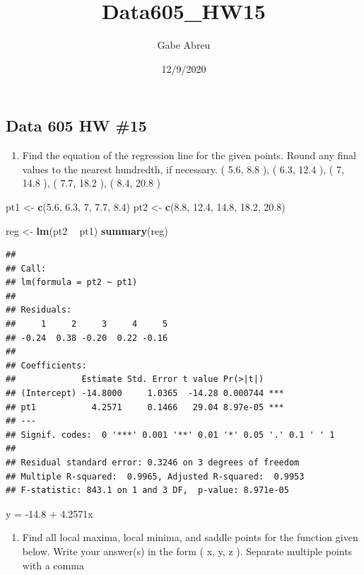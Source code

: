 \documentclass[
]{article}
\title{Data605\_HW15}
\author{Gabe Abreu}
\date{12/9/2020}
\newenvironment{Shaded}{\begin{snugshade}}{\end{snugshade}}
\newcommand{\DecValTok}[1]{\textcolor[rgb]{0.00,0.00,0.81}{#1}}
\newcommand{\FloatTok}[1]{\textcolor[rgb]{0.00,0.00,0.81}{#1}}
\newcommand{\KeywordTok}[1]{\textcolor[rgb]{0.13,0.29,0.53}{\textbf{#1}}}
\newcommand{\NormalTok}[1]{#1}
\newcommand{\OperatorTok}[1]{\textcolor[rgb]{0.81,0.36,0.00}{\textbf{#1}}}
\newcommand{\StringTok}[1]{\textcolor[rgb]{0.31,0.60,0.02}{#1}}
\providecommand{\tightlist}{%
  \setlength{\itemsep}{0pt}\setlength{\parskip}{0pt}}
\begin{document}
\maketitle

\hypertarget{data-605-hw-15}{%
\subsection{Data 605 HW \#15}\label{data-605-hw-15}}

\begin{enumerate}
\def\labelenumi{\arabic{enumi}.}
\tightlist
\item
  Find the equation of the regression line for the given points. Round
  any final values to the nearest hundredth, if necessary. ( 5.6, 8.8 ),
  ( 6.3, 12.4 ), ( 7, 14.8 ), ( 7.7, 18.2 ), ( 8.4, 20.8 )
\end{enumerate}

\begin{Shaded}
\begin{Highlighting}[]
\NormalTok{pt1 <-}\StringTok{ }\KeywordTok{c}\NormalTok{(}\FloatTok{5.6}\NormalTok{, }\FloatTok{6.3}\NormalTok{, }\DecValTok{7}\NormalTok{, }\FloatTok{7.7}\NormalTok{, }\FloatTok{8.4}\NormalTok{)}
\NormalTok{pt2 <-}\StringTok{ }\KeywordTok{c}\NormalTok{(}\FloatTok{8.8}\NormalTok{, }\FloatTok{12.4}\NormalTok{, }\FloatTok{14.8}\NormalTok{, }\FloatTok{18.2}\NormalTok{, }\FloatTok{20.8}\NormalTok{)}

\NormalTok{reg <-}\StringTok{ }\KeywordTok{lm}\NormalTok{(pt2 }\OperatorTok{~}\StringTok{ }\NormalTok{pt1)}
\KeywordTok{summary}\NormalTok{(reg)}
\end{Highlighting}
\end{Shaded}

\begin{verbatim}
## 
## Call:
## lm(formula = pt2 ~ pt1)
## 
## Residuals:
##     1     2     3     4     5 
## -0.24  0.38 -0.20  0.22 -0.16 
## 
## Coefficients:
##             Estimate Std. Error t value Pr(>|t|)    
## (Intercept) -14.8000     1.0365  -14.28 0.000744 ***
## pt1           4.2571     0.1466   29.04 8.97e-05 ***
## ---
## Signif. codes:  0 '***' 0.001 '**' 0.01 '*' 0.05 '.' 0.1 ' ' 1
## 
## Residual standard error: 0.3246 on 3 degrees of freedom
## Multiple R-squared:  0.9965, Adjusted R-squared:  0.9953 
## F-statistic: 843.1 on 1 and 3 DF,  p-value: 8.971e-05
\end{verbatim}

y = -14.8 + 4.2571x

\begin{enumerate}
\def\labelenumi{\arabic{enumi}.}
\setcounter{enumi}{1}
\tightlist
\item
  Find all local maxima, local minima, and saddle points for the
  function given below. Write your answer(s) in the form ( x, y, z ).
  Separate multiple points with a comma
\end{enumerate}
\end{document}
